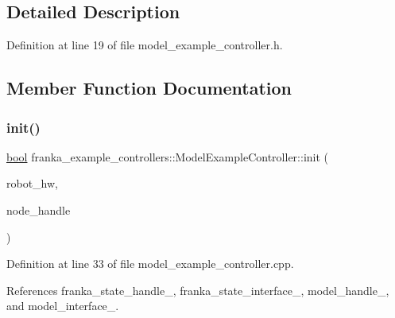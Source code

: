 \subsection{Detailed Description}


Definition at line 19 of file model\+\_\+example\+\_\+controller.\+h.



\subsection{Member Function Documentation}
\mbox{\label{classfranka__example__controllers_1_1ModelExampleController_a423f7ebfd4e0b81cdfbefbdb002cde37}} 
\subsubsection{\texorpdfstring{init()}{init()}}
{\footnotesize\ttfamily \hyperlink{classbool}{bool} franka\+\_\+example\+\_\+controllers\+::\+Model\+Example\+Controller\+::init (\begin{DoxyParamCaption}\item[{hardware\+\_\+interface\+::\+Robot\+HW $\ast$}]{robot\+\_\+hw,  }\item[{ros\+::\+Node\+Handle \&}]{node\+\_\+handle }\end{DoxyParamCaption})\hspace{0.3cm}{\ttfamily [override]}}



Definition at line 33 of file model\+\_\+example\+\_\+controller.\+cpp.



References franka\+\_\+state\+\_\+handle\+\_\+, franka\+\_\+state\+\_\+interface\+\_\+, model\+\_\+handle\+\_\+, and model\+\_\+interface\+\_\+.


